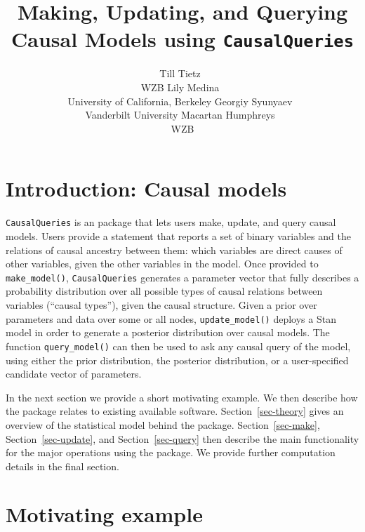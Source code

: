 \documentclass[
  11pt,
  article]{jss}
\author{Till Tietz~\orcidlink{0000-0002-2916-9059}\\WZB \And Lily
Medina~\orcidlink{0009-0004-2423-524X}\\University of California,
Berkeley \AND Georgiy
Syunyaev~\orcidlink{0000-0002-4391-6313}\\Vanderbilt
University \And Macartan Humphreys~\orcidlink{0000-0001-7029-2326}\\WZB}
\title{Making, Updating, and Querying Causal Models using
\texttt{CausalQueries}}
\begin{document}
\maketitle
\ifdefined\Shaded\renewenvironment{Shaded}{\begin{tcolorbox}[enhanced, boxrule=0pt, sharp corners, frame hidden, breakable, borderline west={3pt}{0pt}{shadecolor}, interior hidden]}{\end{tcolorbox}}\fi

\hypertarget{sec-intro}{%
\section{Introduction: Causal models}\label{sec-intro}}

\texttt{CausalQueries} is an  package that lets users make,
update, and query causal models. Users provide a statement that reports
a set of binary variables and the relations of causal ancestry between
them: which variables are direct causes of other variables, given the
other variables in the model. Once provided to \texttt{make\_model()},
\texttt{CausalQueries} generates a parameter vector that fully describes
a probability distribution over all possible types of causal relations
between variables (``causal types''), given the causal structure. Given
a prior over parameters and data over some or all nodes,
\texttt{update\_model()} deploys a Stan \citep{carpenter_stan_2017}
model in order to generate a posterior distribution over causal models.
The function \texttt{query\_model()} can then be used to ask any causal
query of the model, using either the prior distribution, the posterior
distribution, or a user-specified candidate vector of parameters.

In the next section we provide a short motivating example. We then
describe how the package relates to existing available software.
Section~\ref{sec-theory} gives an overview of the statistical model
behind the package. Section~\ref{sec-make}, Section~\ref{sec-update},
and Section~\ref{sec-query} then describe the main functionality for the
major operations using the package. We provide further computation
details in the final section.

\hypertarget{motivating-example}{%
\section{Motivating example}\label{motivating-example}}
\end{document}
